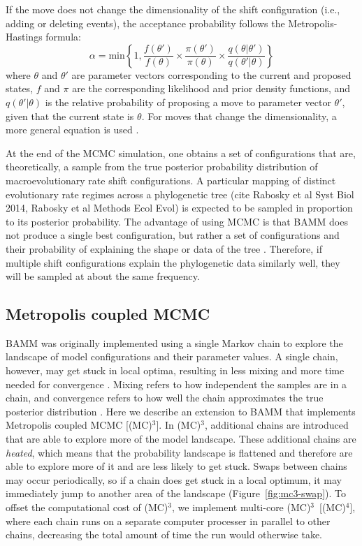 \documentclass[12pt]{article}
\newcommand{\MCMCMC}{(MC)$^{3}$}
\newcommand{\MCMCMCMC}{(MC)$^{4}$}
\begin{document}
If the move does not change the dimensionality of the shift configuration
(i.e., adding or deleting events),
the acceptance probability follows the Metropolis-Hastings formula:
\[\alpha = \text{min}\left\{ 1,
    \frac{f(\theta')}{f(\theta)} \times
    \frac{\pi(\theta')}{\pi(\theta)} \times
    \frac{q(\theta | \theta')}{q(\theta' | \theta)}
\right\}\]
where $\theta$ and $\theta'$ are parameter vectors
corresponding to the current and proposed states,
$f$ and $\pi$ are the corresponding likelihood and prior density functions,
and $q(\theta' | \theta)$ is the relative probability
of proposing a move to parameter vector $\theta'$,
given that the current state is $\theta$.
%
For moves that change the dimensionality,
a more general equation is used \citep[see][]{rab14plos}.

At the end of the MCMC simulation, one obtains a set of configurations
that are, theoretically, a sample from the true posterior probability distribution of macroevolutionary rate 
shift configurations. A particular mapping of distinct evolutionary rate
regimes across a phylogenetic tree (cite Rabosky et al Syst Biol 2014, Rabosky et al Methods Ecol Evol)
is expected to be sampled in proportion to its posterior probability.
%
The advantage of using MCMC
is that BAMM does not produce a single best configuration,
but rather a set of configurations and their probability
of explaining the shape or data of the tree \citep{rab14plos}.
%
Therefore, if multiple shift configurations
explain the phylogenetic data similarly well,
they will be sampled at about the same frequency.


\subsection*{Metropolis coupled MCMC}

BAMM was originally implemented using a single Markov chain
to explore the landscape of model configurations and their parameter values.
%
A single chain, however, may get stuck in local optima,
resulting in less mixing and more time needed for convergence \citep{alt04}.
%
Mixing refers to how independent the samples are in a chain,
and convergence refers to how well the chain
approximates the true posterior distribution \citep{giv05}.
%
Here we describe an extension to BAMM
that implements Metropolis coupled MCMC [\MCMCMC].
%
In \MCMCMC, additional chains are introduced
that are able to explore more of the model landscape.
%
These additional chains are \emph{heated},
which means that the probability landscape is flattened
and therefore are able to explore more of it
and are less likely to get stuck.
%
Swaps between chains may occur periodically,
so if a chain does get stuck in a local optimum,
it may immediately jump to another area of the landscape
(Figure~\ref{fig:mc3-swap}).
%
To offset the computational cost of \MCMCMC, we implement
multi-core \MCMCMC\ [\MCMCMCMC], where each chain
runs on a separate computer processer in parallel to other chains,
decreasing the total amount of time the run would otherwise take.
\end{document}
